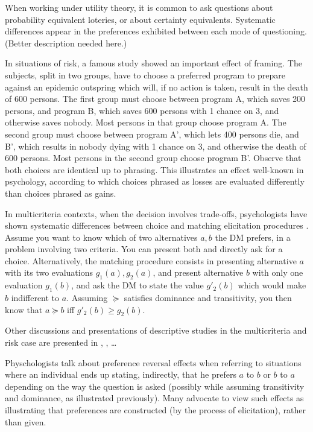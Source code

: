 \documentclass[french, english]{llncs}
\begin{document}
	When working under utility theory, it is common to ask questions about probability equivalent loteries, or about certainty equivalents. Systematic differences appear in the preferences exhibited between each mode of questioning. (Better description needed here.) 
	
	In situations of risk, a famous study \citep{tversky_1981} showed an important effect of framing. The subjects, split in two groups, have to choose a preferred program to prepare against an epidemic outspring which will, if no action is taken, result in the death of 600 persons. The first group must choose between program A, which saves 200 persons, and program B, which saves 600 persons with 1 chance on 3, and otherwise saves nobody. Most persons in that group choose program A. The second group must choose between program A', which lets 400 persons die, and B', which results in nobody dying with 1 chance on 3, and otherwise the death of 600 persons. Most persons in the second group choose program B'. Observe that both choices are identical up to phrasing. This illustrates an effect well-known in psychology, according to which choices phrased as losses are evaluated differently than choices phrased as gains.
	
	In multicriteria contexts, when the decision involves trade-offs, psychologists have shown systematic differences between choice and matching elicitation procedures \citep{tversky_contingent_1988}. Assume you want to know which of two alternatives $a, b$ the \ac{DM} prefers, in a problem involving two criteria. You can present both and directly ask for a choice. Alternatively, the matching procedure consists in presenting alternative $a$ with its two evaluations $g_1(a), g_2(a)$, and present alternative $b$ with only one evaluation $g_1(b)$, and ask the \ac{DM} to state the value $g'_2(b)$ which would make $b$ indifferent to $a$. Assuming $\succeq$ satisfies dominance and transitivity, you then know that $a \succeq b$ iff $g'_2(b) ≥ g_2(b)$.
	
	Other discussions and presentations of descriptive studies in the multicriteria and risk case are presented in \citet[Ch. 2]{deparis_2012}, \citet{slovic_construction_2006, Camerer and Ho (1994)}, …
	
	Physchologists talk about preference reversal effects when referring to situations where an individual ends up stating, indirectly, that he prefers $a$ to $b$ or $b$ to $a$ depending on the way the question is asked (possibly while assuming transitivity and dominance, as illustrated previously). Many advocate to view such effects as illustrating that preferences are constructed (by the process of elicitation), rather than given.
	
\end{document}
